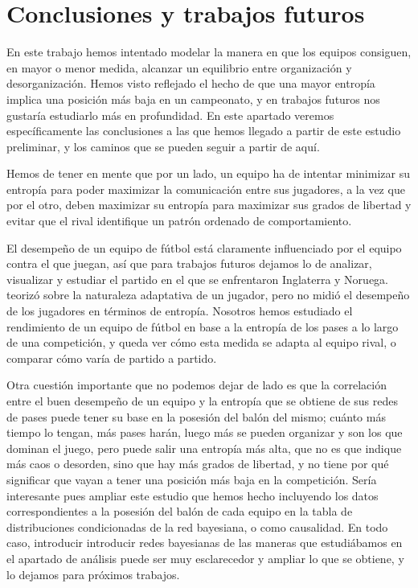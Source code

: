 \chapter{Conclusiones y trabajos futuros}
En este trabajo hemos intentado modelar la manera en que los equipos consiguen, en mayor o menor medida,
alcanzar un equilibrio entre organización y desorganización. Hemos visto reflejado el hecho de que una 
mayor entropía implica una posición más baja en un campeonato, y en trabajos futuros nos gustaría estudiarlo 
más en profundidad. En este apartado veremos específicamente las conclusiones a las que hemos llegado a partir 
de este estudio preliminar, y los caminos que se pueden seguir a partir de aquí.

Hemos de tener en mente que por un lado, un equipo ha de intentar minimizar su entropía para poder maximizar 
la comunicación entre sus jugadores, a la vez que por el otro, deben maximizar su entropía para maximizar sus 
grados de libertad y evitar que el rival identifique un patrón ordenado de comportamiento.
\cite{entropy-analysis}

El desempeño de un equipo de fútbol está claramente influenciado por el equipo contra el que juegan, así que para 
trabajos futuros dejamos lo de analizar, visualizar y estudiar el partido en el que se enfrentaron Inglaterra 
y Noruega. \cite{donogue} teorizó sobre la naturaleza adaptativa de un jugador, pero no midió el desempeño de los 
jugadores en términos de entropía. Nosotros hemos estudiado el rendimiento de un equipo de fútbol en base 
a la entropía de los pases a lo largo de una competición, y queda ver cómo esta medida se adapta al equipo 
rival, o comparar cómo varía de partido a partido.

Otra cuestión importante que no podemos dejar de lado es que la correlación entre el buen desempeño de un 
equipo y la entropía que se obtiene de sus redes de pases puede tener su base en la posesión del balón 
del mismo; cuánto más tiempo lo tengan, más pases harán, luego más se pueden organizar y son los que 
dominan el juego, pero puede salir una entropía más alta, que no es que indique más caos o desorden, 
sino que hay más grados de libertad, y no tiene por qué significar que vayan a tener una posición más baja en la 
competición. Sería interesante pues ampliar este estudio que hemos hecho 
incluyendo los datos correspondientes a la posesión del balón de cada equipo en la tabla de distribuciones 
condicionadas de la red bayesiana, o como causalidad. En todo caso, introducir introducir redes bayesianas de las 
maneras que estudiábamos en el apartado de análisis puede ser muy esclarecedor y ampliar lo que se obtiene, y lo 
dejamos para próximos trabajos.